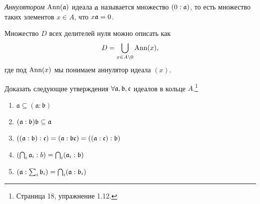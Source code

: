     \begin{Def}
        \textit{Аннулятором} $\textup{Ann}(\mathfrak{a})$ идеала $\mathfrak{a}$ называется множество $(0 : \mathfrak{a})$, то есть множество таких элементов $x \in A$, что $x\mathfrak{a} = 0$.
    \end{Def}
    Множество $D$ всех делителей нуля можно описать как 
    $$
        D = \bigcup_{x \in A \backslash 0} \textup{Ann}(x),
    $$
    где под $\textup{Ann}(x)$ мы понимаем аннулятор идеала $(x)$.
    \begin{Ex}
        Доказать следующие утверждения $\forall \mathfrak{a}, \mathfrak{b}, \mathfrak{c}$ идеалов в кольце $A$.\footnote{\cite{A-M} Страница 18, упражнение 1.12.}
        \begin{enumerate}
            \item $\mathfrak{a} \subseteq (\mathfrak{a} : \mathfrak{b})$
            \item $(\mathfrak{a} : \mathfrak{b})\mathfrak{b} \subseteq \mathfrak{a}$
            \item $((\mathfrak{a} : \mathfrak{b}) : \mathfrak{c}) = (\mathfrak{a} : \mathfrak{bc}) = ((\mathfrak{a} : \mathfrak{c}) : \mathfrak{b})$
            \item $\left( \bigcap_{i} \mathfrak{a}_i : b \right) = \bigcap_i (\mathfrak{a}_i : \mathfrak{b})$
            \item $\left( \mathfrak{a} : \sum_i \mathfrak{b}_i \right) = \bigcap_i (\mathfrak{a} : \mathfrak{b}_i)$
        \end{enumerate}
    \end{Ex}
